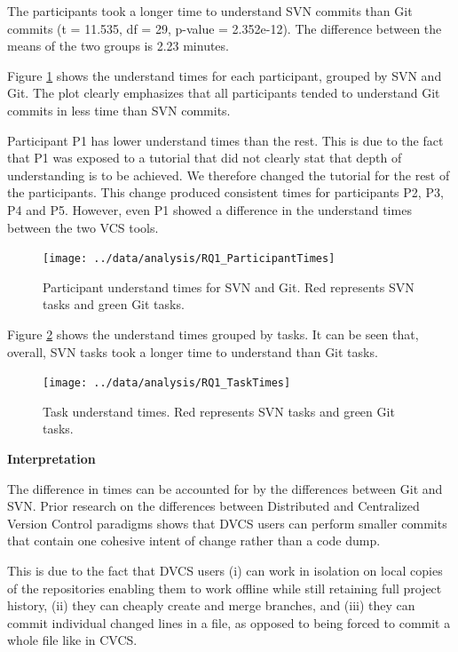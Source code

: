 \documentclass[letterpaper]{article}
\begin{document}
The participants took a longer time to understand SVN commits than Git commits (t = 11.535, df = 29, p-value = 2.352e-12). The difference between the means of the two groups is 2.23 minutes.

Figure \ref{fig:rq1-participantTimes} shows the understand times for each participant, grouped by SVN and Git.
The plot clearly emphasizes that all participants tended to understand Git commits in less time than SVN commits.

Participant P1 has lower understand times than the rest.
This is due to the fact that P1 was exposed to a tutorial that did not clearly stat that depth of understanding is to be achieved.
We therefore changed the tutorial for the rest of the participants.
This change produced consistent times for participants P2, P3, P4 and P5.
However, even P1 showed a difference in the understand times between the two VCS tools.

\begin{figure}[H]
    \centering
    \texttt{[image: ../data/analysis/RQ1\_ParticipantTimes]}
    \caption{Participant understand times for SVN and Git. Red represents SVN tasks and green Git tasks.}
    \label{fig:rq1-participantTimes}
\end{figure}

Figure \ref{fig:rq1-taskTimes} shows the understand times grouped by tasks.
It can be seen that, overall, SVN tasks took a longer time to understand than Git tasks.

\begin{figure}[H]
    \centering
    \texttt{[image: ../data/analysis/RQ1\_TaskTimes]}
    \caption{Task understand times. Red represents SVN tasks and green Git tasks.}
    \label{fig:rq1-taskTimes}
\end{figure}


\textbf{Interpretation}

The difference in times can be accounted for by the differences between Git and SVN. 
Prior research on the differences between Distributed and Centralized Version Control paradigms shows that DVCS users can perform smaller commits that contain one cohesive intent of change rather than a code dump.

This is due to the fact that DVCS users (i) can work in isolation on local copies of the repositories enabling them to work offline while still retaining full project history, (ii) they can cheaply create and merge branches, and (iii) they can commit individual changed lines in a file, as opposed to being forced to commit a whole file like in CVCS.
\end{document}
